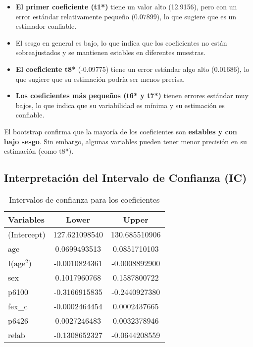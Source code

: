 \documentclass[12pt,a4paper,onecolumn]{article}
\begin{document}
\begin{itemize}
    \item \textbf{El primer coeficiente (t1*)} tiene un valor alto (12.9156), pero con un error estándar relativamente pequeño (0.07899), lo que sugiere que es un estimador confiable.

    \item El sesgo en general es bajo, lo que indica que los coeficientes no están sobreajustados y se mantienen estables en diferentes muestras.

    \item \textbf{El coeficiente t8*} (-0.09775) tiene un error estándar algo alto (0.01686), lo que sugiere que su estimación podría ser menos precisa.

    \item \textbf{Los coeficientes más pequeños (t6* y t7*)} tienen errores estándar muy bajos, lo que indica que su variabilidad es mínima y su estimación es confiable.
\end{itemize}

El bootstrap confirma que la mayoría de los coeficientes son \textbf{estables y con bajo sesgo}. Sin embargo, algunas variables pueden tener menor precisión en su estimación (como t8*).

\subsection{Interpretación del Intervalo de Confianza (IC)}

\begin{table}[htbp]
    \centering
    \caption{Intervalos de confianza para los coeficientes}
    \label{tab:confidence_intervals}
    \begin{tabular}{lcc}
    \toprule
    \textbf{Variables} & \textbf{Lower} & \textbf{Upper} \\
    \midrule
    (Intercept) & 127.621098540 & 130.685510906 \\
    age & 0.0699493513 & 0.0851710103 \\
    I(age$^2$) & -0.0010824361 & -0.0008892900 \\
    sex & 0.1017960768 & 0.1587800722 \\
    p6100 & -0.3166915835 & -0.2440927380 \\
    fex\_c & -0.0002464454 & 0.0002437665 \\
    p6426 & 0.0027246483 & 0.0032378946 \\
    relab & -0.1308652327 & -0.0644208559 \\
    \bottomrule
    \end{tabular}
\end{table}
\end{document}
